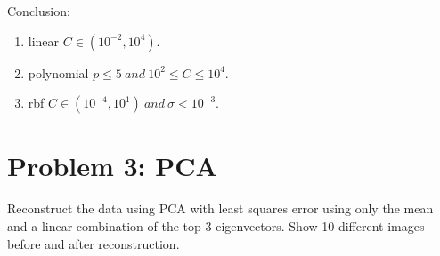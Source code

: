 \documentclass[a4paper,12pt]{article}
\begin{document}
Conclusion:
\begin{enumerate}
\item linear \qquad $C \in (10^{-2}, 10^4)$.

\item polynomial \qquad $p \leq 5 \ and \ 10^2 \leq C \leq10^4$.

\item rbf \qquad $C \in (10^{-4} , 10^1) \ and \ \sigma < 10^{-3}$.
\end{enumerate}

\section{Problem 3: PCA}

 Reconstruct the data using PCA with least squares error using only the mean and a linear combination of the top 3 eigenvectors. Show 10 different images before and after reconstruction.
 
\end{document}
